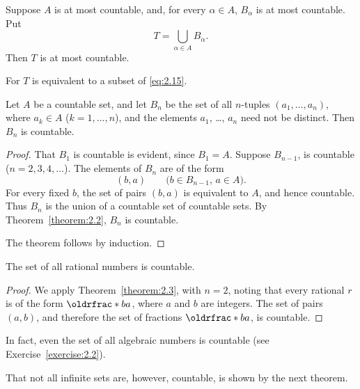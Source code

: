 \begin{corollary}
    Suppose \(A\) is at most countable, and, for every \(\alpha\in A\), \(B_\alpha\) is at most countable. Put
    \begin{equation*}
        T=\bigcup_{\alpha\in A}B_\alpha.
    \end{equation*}
    Then \(T\) is at most countable.
\end{corollary}

For \(T\) is equivalent to a subset of \eqref{eq:2.15}.

\begin{theorem}\label{theorem:2.3}
    Let \(A\) be a countable set, and let \(B_n\) be the set of all \(n\)-tuples \(\left(a_1,\ldots,a_n\right)\), where \(a_k\in A\) (\(k=1,\ldots,n\)), and the elements \(a_1\), \ldots, \(a_n\) need not be distinct. Then \(B_n\) is countable.
\end{theorem}

\begin{proof}
    That \(B_1\) is countable is evident, since \(B_1=A\). Suppose \(B_{n-1}\), is countable (\(n=2,3,4,\ldots\)). The elements of \(B_n\) are of the form
    \begin{equation}
        \left(b,a\right)\qquad\text{(\(b\in B_{n-1}\), \(a\in A\))}.
    \end{equation}
    For every fixed \(b\), the set of pairs \(\left(b,a\right)\) is equivalent to \(A\), and hence countable. Thus \(B_n\) is the union of a countable set of countable sets. By Theorem~\ref{theorem:2.2}, \(B_n\) is countable.

    The theorem follows by induction.
\end{proof}

\begin{corollary}
    The set of all rational numbers is countable.
\end{corollary}

\begin{proof}
    We apply Theorem~\ref{theorem:2.3}, with \(n=2\), noting that every rational \(r\) is of the form \(\rfrac{b}{a}\), where \(a\) and \(b\) are integers. The set of pairs \(\left(a,b\right)\), and therefore the set of fractions \(\rfrac{b}{a}\), is countable.
\end{proof}

In fact, even the set of all algebraic numbers is countable (see Exercise~\ref{exercise:2.2}).

That not all infinite sets are, however, countable, is shown by the next theorem.

